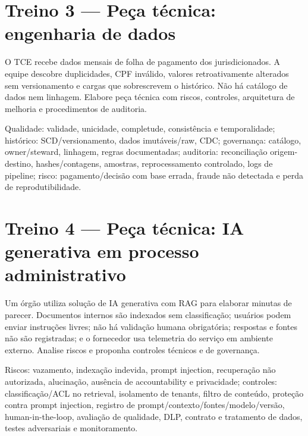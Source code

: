 \section{Treino 3 — Peça técnica: engenharia de dados}

\begin{discursiva}
O TCE recebe dados mensais de folha de pagamento dos jurisdicionados. A equipe descobre duplicidades, CPF inválido, valores retroativamente alterados sem versionamento e cargas que sobrescrevem o histórico. Não há catálogo de dados nem linhagem. Elabore peça técnica com riscos, controles, arquitetura de melhoria e procedimentos de auditoria.
\end{discursiva}

\begin{resumo}
Qualidade: validade, unicidade, completude, consistência e temporalidade; histórico: SCD/versionamento, dados imutáveis/raw, CDC; governança: catálogo, owner/steward, linhagem, regras documentadas; auditoria: reconciliação origem-destino, hashes/contagens, amostras, reprocessamento controlado, logs de pipeline; risco: pagamento/decisão com base errada, fraude não detectada e perda de reprodutibilidade.
\end{resumo}

\section{Treino 4 — Peça técnica: IA generativa em processo administrativo}

\begin{discursiva}
Um órgão utiliza solução de IA generativa com RAG para elaborar minutas de parecer. Documentos internos são indexados sem classificação; usuários podem enviar instruções livres; não há validação humana obrigatória; respostas e fontes não são registradas; e o fornecedor usa telemetria do serviço em ambiente externo. Analise riscos e proponha controles técnicos e de governança.
\end{discursiva}

\begin{resumo}
Riscos: vazamento, indexação indevida, prompt injection, recuperação não autorizada, alucinação, ausência de accountability e privacidade; controles: classificação/ACL no retrieval, isolamento de tenants, filtro de conteúdo, proteção contra prompt injection, registro de prompt/contexto/fontes/modelo/versão, human-in-the-loop, avaliação de qualidade, DLP, contrato e tratamento de dados, testes adversariais e monitoramento.
\end{resumo}


